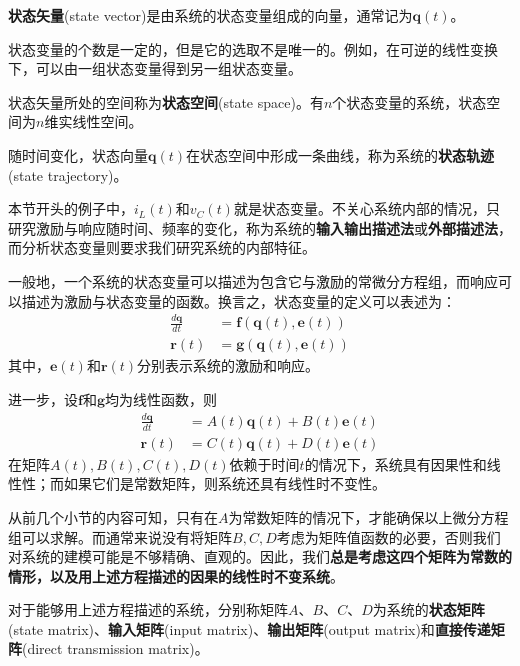 \documentclass{ctexbook}
\begin{document}
\begin{definition}[状态矢量]
    \textbf{状态矢量}(state vector)是由系统的状态变量组成的向量，通常记为$\mathbf{q}(t)$。
\end{definition}

状态变量的个数是一定的，但是它的选取不是唯一的。例如，在可逆的线性变换下，可以由一组状态变量得到另一组状态变量。
    
\begin{definition}[状态空间和状态轨迹]
    状态矢量所处的空间称为\textbf{状态空间}(state space)。有$n$个状态变量的系统，状态空间为$n$维实线性空间。
    
    随时间变化，状态向量$\mathbf{q}(t)$在状态空间中形成一条曲线，称为系统的\textbf{状态轨迹}(state trajectory)。
\end{definition}

本节开头的例子中，$i_L(t)$和$v_C(t)$就是状态变量。不关心系统内部的情况，只研究激励与响应随时间、频率的变化，称为系统的\textbf{输入输出描述法}或\textbf{外部描述法}，而分析状态变量则要求我们研究系统的内部特征。

一般地，一个系统的状态变量可以描述为包含它与激励的常微分方程组，而响应可以描述为激励与状态变量的函数。换言之，状态变量的定义可以表述为：\begin{align*}
    \frac{d\mathbf{q}}{dt}&=\mathbf{f}(\mathbf{q}(t),\mathbf{e}(t))\\
    \mathbf{r}(t)&=\mathbf{g}(\mathbf{q}(t),\mathbf{e}(t))
\end{align*}
其中，$\mathbf{e}(t)$和$\mathbf{r}(t)$分别表示系统的激励和响应。

进一步，设$\mathbf{f}$和$\mathbf{g}$均为线性函数，则\begin{align*}
    \frac{d\mathbf{q}}{dt}&=A(t)\mathbf{q}(t)+B(t)\mathbf{e}(t)\\
    \mathbf{r}(t)&=C(t)\mathbf{q}(t)+D(t)\mathbf{e}(t)
\end{align*}
在矩阵$A(t),B(t),C(t),D(t)$依赖于时间$t$的情况下，系统具有因果性和线性性；而如果它们是常数矩阵，则系统还具有线性时不变性。

从前几个小节的内容可知，只有在$A$为常数矩阵的情况下，才能确保以上微分方程组可以求解。而通常来说没有将矩阵$B,C,D$考虑为矩阵值函数的必要，否则我们对系统的建模可能是不够精确、直观的。因此，我们\textbf{总是考虑这四个矩阵为常数的情形，以及用上述方程描述的因果的线性时不变系统}。

\begin{definition}
    对于能够用上述方程描述的系统，分别称矩阵$A$、$B$、$C$、$D$为系统的\textbf{状态矩阵}(state matrix)、\textbf{输入矩阵}(input matrix)、\textbf{输出矩阵}(output matrix)和\textbf{直接传递矩阵}(direct transmission matrix)。
\end{definition}
\end{document}
